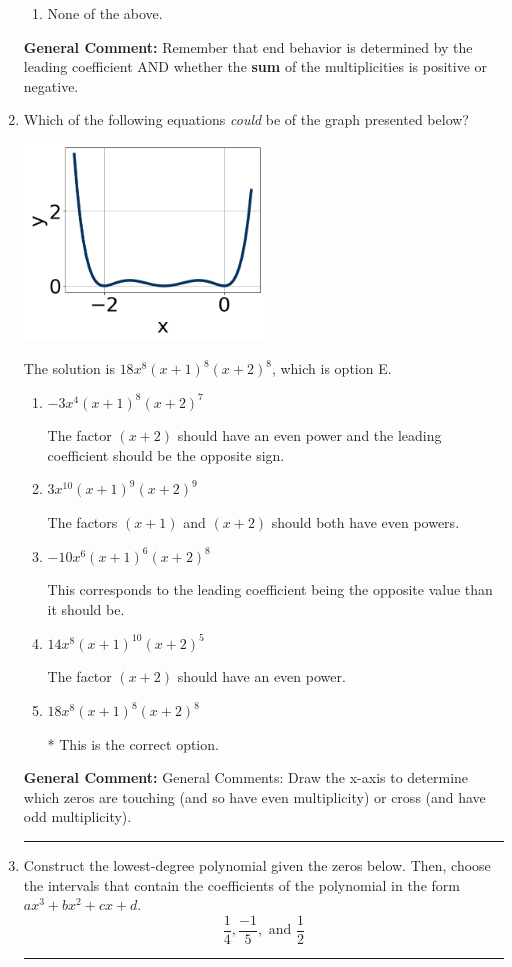 \documentclass{extbook}[14pt]
\newcommand{\litem}[1]{\item #1

\rule{\textwidth}{0.4pt}}
\begin{document}
\begin{enumerate}
{\begin{enumerate}[label=\Alph*.]
\begin{multicols}{2}
\end{multicols}\item None of the above.\end{enumerate}
\textbf{General Comment:} Remember that end behavior is determined by the leading coefficient AND whether the \textbf{sum} of the multiplicities is positive or negative.
}
\litem{
Which of the following equations \textit{could} be of the graph presented below?

\begin{center}
    \includegraphics[width=0.5\textwidth]{../Figures/polyGraphToFunctionCopyC.png}
\end{center}




The solution is \( 18x^{8} (x + 1)^{8} (x + 2)^{8} \), which is option E.\begin{enumerate}[label=\Alph*.]
\item \( -3x^{4} (x + 1)^{8} (x + 2)^{7} \)

The factor $(x + 2)$ should have an even power and the leading coefficient should be the opposite sign.
\item \( 3x^{10} (x + 1)^{9} (x + 2)^{9} \)

The factors $(x + 1)$ and $(x + 2)$ should both have even powers.
\item \( -10x^{6} (x + 1)^{6} (x + 2)^{8} \)

This corresponds to the leading coefficient being the opposite value than it should be.
\item \( 14x^{8} (x + 1)^{10} (x + 2)^{5} \)

The factor $(x + 2)$ should have an even power.
\item \( 18x^{8} (x + 1)^{8} (x + 2)^{8} \)

* This is the correct option.
\end{enumerate}

\textbf{General Comment:} General Comments: Draw the x-axis to determine which zeros are touching (and so have even multiplicity) or cross (and have odd multiplicity).
}
\litem{
Construct the lowest-degree polynomial given the zeros below. Then, choose the intervals that contain the coefficients of the polynomial in the form $ax^3+bx^2+cx+d$.
\[ \frac{1}{4}, \frac{-1}{5}, \text{ and } \frac{1}{2} \]

}
\end{enumerate}
\end{document}
